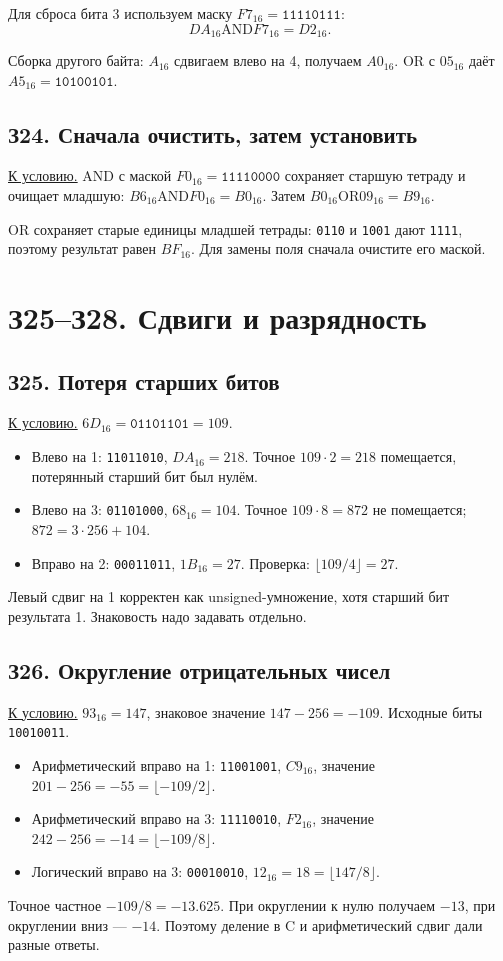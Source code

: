 Для сброса бита 3 используем маску $F7_{16}=\texttt{11110111}$:
\[
DA_{16}\mathbin{\mathrm{AND}}F7_{16}=D2_{16}.
\]

Сборка другого байта: $A_{16}$ сдвигаем влево на 4, получаем $A0_{16}$. OR с $05_{16}$ даёт $A5_{16}=\texttt{10100101}$.

\subsection*{З24. Сначала очистить, затем установить}\label{sol:z24}
\hyperref[task:z24]{К условию.}
AND с маской $F0_{16}=\texttt{11110000}$ сохраняет старшую тетраду и очищает младшую:
$B6_{16}\mathbin{\mathrm{AND}}F0_{16}=B0_{16}$.
Затем $B0_{16}\mathbin{\mathrm{OR}}09_{16}=B9_{16}$.

OR сохраняет старые единицы младшей тетрады: \texttt{0110} и \texttt{1001} дают \texttt{1111}, поэтому результат равен $BF_{16}$. Для замены поля сначала очистите его маской.

\section{З25--З28. Сдвиги и разрядность}
\subsection*{З25. Потеря старших битов}\label{sol:z25}
\hyperref[task:z25]{К условию.}
$6D_{16}=\texttt{01101101}=109$.
\begin{itemize}
    \item Влево на 1: \texttt{11011010}, $DA_{16}=218$. Точное $109\cdot2=218$ помещается, потерянный старший бит был нулём.
    \item Влево на 3: \texttt{01101000}, $68_{16}=104$. Точное $109\cdot8=872$ не помещается; $872=3\cdot256+104$.
    \item Вправо на 2: \texttt{00011011}, $1B_{16}=27$. Проверка: $\lfloor109/4\rfloor=27$.
\end{itemize}
Левый сдвиг на 1 корректен как unsigned-умножение, хотя старший бит результата 1. Знаковость надо задавать отдельно.

\subsection*{З26. Округление отрицательных чисел}\label{sol:z26}
\hyperref[task:z26]{К условию.}
$93_{16}=147$, знаковое значение $147-256=-109$.
Исходные биты \texttt{10010011}.
\begin{itemize}
    \item Арифметический вправо на 1: \texttt{11001001}, $C9_{16}$, значение $201-256=-55=\lfloor-109/2\rfloor$.
    \item Арифметический вправо на 3: \texttt{11110010}, $F2_{16}$, значение $242-256=-14=\lfloor-109/8\rfloor$.
    \item Логический вправо на 3: \texttt{00010010}, $12_{16}=18=\lfloor147/8\rfloor$.
\end{itemize}
Точное частное $-109/8=-13.625$. При округлении к нулю получаем $-13$, при округлении вниз --- $-14$. Поэтому деление в C и арифметический сдвиг дали разные ответы.

